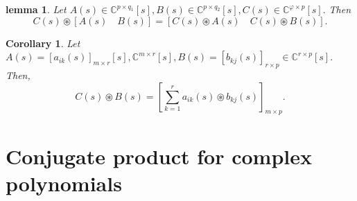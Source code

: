 \documentclass[12pt,a4paper,fleqn,twoside]{article}
\newtheorem{lemma}{lemma}
\newtheorem{corollary}{Corollary}
\theoremstyle{plain}
\begin{document}
	\begin{lemma}
		Let \(A(s)\in \mathbb{C}^{p \times q_1}[s], B(s) \in \mathbb{C}^{p \times q_2}[s], C(s) \in \mathbb{C}^{\varphi \times p}[s].\) Then
		\begin{equation*}
			C(s) \circledast [A(s)\quad B(s)]= [C(s) \circledast A(s)\quad C(s) \circledast B(s)].
		\end{equation*}
	\end{lemma}
	\begin{corollary}
		Let \( A(s)=[a_{ik}(s)]_{m \times r}[s], \mathbb{C}^{m \times r}[s],B(s)=[b_{kj}(s)]_{r \times p}\in \mathbb{C}^{r \times p}[s].\) Then, 
		\[C(s)\circledast B(s)= \left[\displaystyle \sum_{k=1}^{r} a_{ik}(s)\circledast b_{kj}(s)\right]_{m \times p}.\]
	\end{corollary}
	\section{Conjugate product for complex polynomials}
\end{document}
